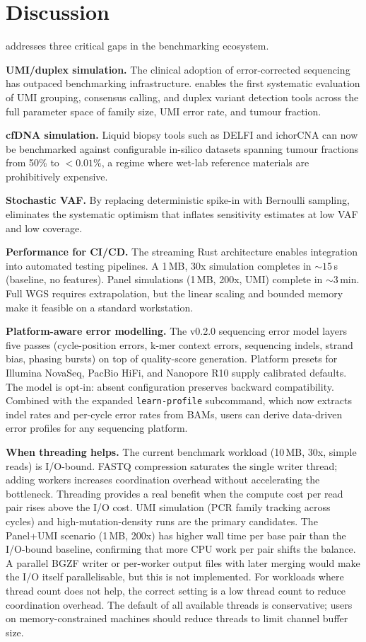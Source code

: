 \section{Discussion}
\label{sec:discussion}

\varforge{} addresses three critical gaps in the benchmarking ecosystem.

\textbf{UMI/duplex simulation.}
The clinical adoption of error-corrected sequencing has outpaced benchmarking infrastructure.
\varforge{} enables the first systematic evaluation of UMI grouping, consensus calling, and duplex variant detection tools across the full parameter space of family size, UMI error rate, and tumour fraction.

\textbf{cfDNA simulation.}
Liquid biopsy tools such as DELFI and ichorCNA can now be benchmarked against configurable in-silico datasets spanning tumour fractions from 50\% to $<0.01\%$, a regime where wet-lab reference materials are prohibitively expensive.

\textbf{Stochastic VAF.}
By replacing deterministic spike-in with Bernoulli sampling, \varforge{} eliminates the systematic optimism that inflates sensitivity estimates at low VAF and low coverage.

\textbf{Performance for CI/CD.}
The streaming Rust architecture enables integration into automated testing pipelines.
A 1\,MB, 30x simulation completes in ${\sim}15$\,s (baseline, no features).
Panel simulations (1\,MB, 200x, UMI) complete in ${\sim}3$\,min.
Full WGS requires extrapolation, but the linear scaling and bounded memory make it feasible on a standard workstation.

\textbf{Platform-aware error modelling.}
The v0.2.0 sequencing error model layers five passes (cycle-position errors, k-mer context errors, sequencing indels, strand bias, phasing bursts) on top of quality-score generation.
Platform presets for Illumina NovaSeq, PacBio HiFi, and Nanopore R10 supply calibrated defaults.
The model is opt-in: absent configuration preserves backward compatibility.
Combined with the expanded \texttt{learn-profile} subcommand, which now extracts indel rates and per-cycle error rates from BAMs, users can derive data-driven error profiles for any sequencing platform.

\textbf{When threading helps.}
The current benchmark workload (10\,MB, 30x, simple reads) is I/O-bound.
FASTQ compression saturates the single writer thread; adding workers increases coordination overhead without accelerating the bottleneck.
Threading provides a real benefit when the compute cost per read pair rises above the I/O cost.
UMI simulation (PCR family tracking across cycles) and high-mutation-density runs are the primary candidates.
The Panel+UMI scenario (1\,MB, 200x) has higher wall time per base pair than the I/O-bound baseline, confirming that more CPU work per pair shifts the balance.
A parallel BGZF writer or per-worker output files with later merging would make the I/O itself parallelisable, but this is not implemented.
For workloads where thread count does not help, the correct setting is a low thread count to reduce coordination overhead.
The default of all available threads is conservative; users on memory-constrained machines should reduce threads to limit channel buffer size.


